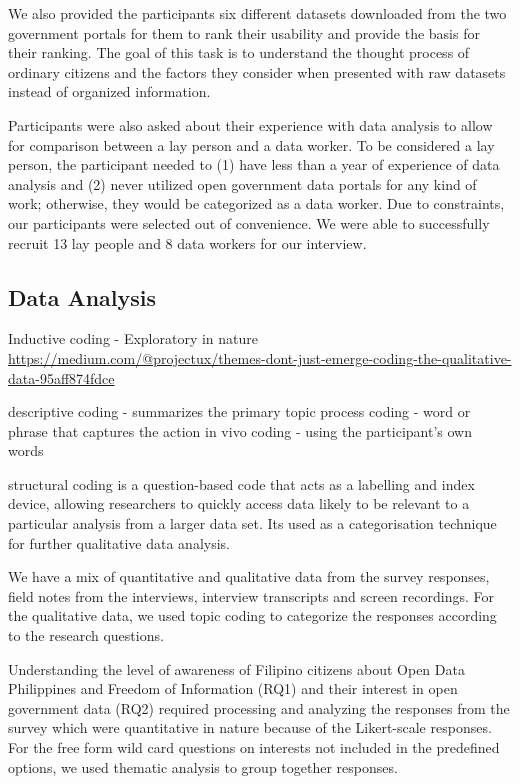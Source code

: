 \documentclass{sigchi}
\begin{document}
We also provided the participants six different datasets downloaded from the two government portals for them to rank their usability and provide the basis for their ranking. The goal of this task is to understand the thought process of ordinary citizens and the factors they consider when presented with raw datasets instead of organized information. 

Participants were also asked about their experience with data analysis to allow for comparison between a lay person and a data worker. To be considered a lay person, the participant needed to (1) have less than a year of experience of data analysis and (2) never utilized open government data portals for any kind of work; otherwise, they would be categorized as a data worker. Due to constraints, our participants were selected out of convenience. We were able to successfully recruit 13 lay people and 8 data workers for our interview.

\subsection{Data Analysis}
Inductive coding - Exploratory in nature
\url{https://medium.com/@projectux/themes-dont-just-emerge-coding-the-qualitative-data-95aff874fdce}

descriptive coding - summarizes the primary topic
process coding - word or phrase that captures the action
in vivo coding - using the participant's own words

structural coding is a question-based code that acts as a labelling and index device, allowing researchers to quickly access data likely to be relevant to a particular analysis from a larger data set. Its used as a categorisation technique for further qualitative data analysis.

We have a mix of quantitative and qualitative data from the survey responses, field notes from the interviews, interview transcripts and screen recordings. For the qualitative data, we used topic coding to categorize the responses according to the research questions.

Understanding the level of awareness of Filipino citizens about Open Data Philippines and Freedom of Information (RQ1) and their interest in open government data (RQ2) required processing and analyzing the responses from the survey which were quantitative in nature because of the Likert-scale responses. For the free form wild card questions on interests not included in the predefined options, we used thematic analysis to group together responses.
\end{document}
